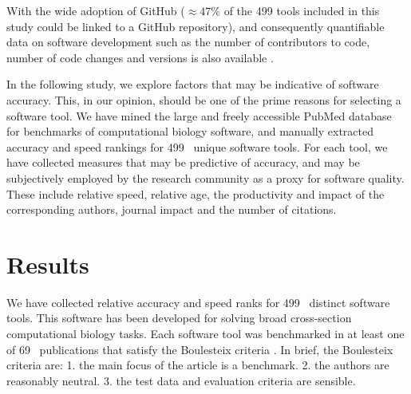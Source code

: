 \documentclass[fleqn,10pt]{SelfArx} %
\def\numTools{499}
\def\numBenchmarkPubs{69}
\begin{document}
With the wide adoption of GitHub ($\approx 47\%$ of the
{\color{black}\numTools} tools included in this study could be
linked to a GitHub repository), and consequently quantifiable data on software
development such as the number of contributors to code, number of code
changes and versions is also available
\cite{ray2014large,Dozmorov:2018,mangul2018comprehensive}.

In the following study, we explore factors that may be indicative of
software accuracy. This, in our opinion, should be one of the prime
reasons for selecting a software tool. We have mined the large and
freely accessible PubMed database \cite{Sayers2010-vm} for benchmarks
of computational biology software, and manually extracted accuracy and
speed rankings for {\color{black}\numTools~} unique software tools. For
each tool, we have collected measures that may be predictive
of accuracy, and may be subjectively employed by the research
community as a proxy for software quality. These include relative
speed, relative age, the productivity and impact of the corresponding
authors, journal impact and the number of citations.

\section*{Results}
We have collected relative accuracy and speed ranks for
{\color{black}\numTools~} distinct software tools. This software has
been developed for solving broad cross-section computational biology
tasks.
Each software tool was benchmarked in at least one of
{\color{black}\numBenchmarkPubs~} publications that satisfy the Boulesteix
criteria \cite{Boulesteix2013-vb}. In brief, the Boulesteix criteria
are: 1. the main focus of the article is a benchmark. 2. the authors
are reasonably neutral. 3. the test data and evaluation criteria are
sensible.
\end{document}
